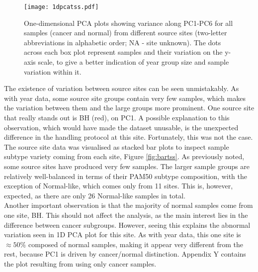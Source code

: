             
            \begin{figure}[!h]
            \centering
            \texttt{[image: 1dpcatss.pdf]}
            \caption[1D PCA plot based on sample source site data]{One-dimensional PCA plots showing variance along PC1-PC6 for all samples (cancer and normal) from different source sites (two-letter abbreviations in alphabetic order; NA - site unknown). The dots across each box plot represent samples and their variation on the y-axis scale, to give a better indication of year group size and sample variation within it.}
            \label{fig:1dpcatss}
            \end{figure}
            
            
  
    The existence of variation between source sites can be seen unmistakably. As with year data, some source site groups contain very few samples, which makes the variation between them and the large groups more prominent. One source site that really stands out is BH (red), on PC1. A possible explanation to this observation, which would have made the dataset unusable, is the unexpected difference in the handling protocol at this site. Fortunately, this was not the case.  \\
    

    The source site data was visualised as stacked bar plots to inspect sample subtype variety coming from each site, Figure \ref{fig:bartss}. As previously noted, some source sites have produced very few samples. The larger sample groups are relatively well-balanced in terms of their PAM50 subtype composition, with the exception of Normal-like, which comes only from 11 sites. This is, however, expected, as there are only 26 Normal-like samples in total. \\
    
    Another important observation is that the majority of normal samples come from one site, BH. This should not affect the analysis, as the main interest lies in the difference between cancer subgroups. However, seeing this explains the abnormal variation seen in 1D PCA plot for this site. As with year data, this one site is $\approx50\%$ composed of normal samples, making it appear very different from the rest, because PC1 is driven by cancer/normal distinction. Appendix Y contains the plot resulting from using only cancer samples. 
  
    \newpage
    

